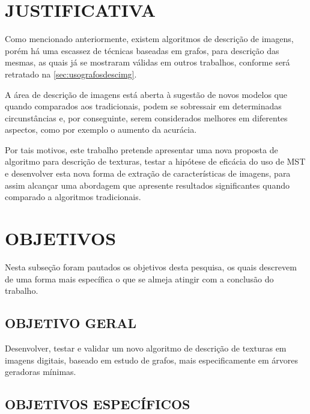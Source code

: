 \section{JUSTIFICATIVA}
\label{sec:justificativa}

\par Como mencionado anteriormente, existem algoritmos de descrição de imagens, porém há uma escassez de técnicas baseadas em grafos, para descrição das mesmas, as quais já se mostraram válidas em outros trabalhos, conforme será retratado na \autoref{sec:usografosdescimg}.

\par A área de descrição de imagens está aberta à sugestão de novos modelos que quando comparados aos tradicionais, podem se sobressair em determinadas circunstâncias e, por conseguinte, serem considerados melhores em diferentes aspectos, como por exemplo o aumento da acurácia. 

\par Por tais motivos, este trabalho pretende apresentar uma nova proposta de algoritmo para descrição de texturas, testar a hipótese de eficácia do uso de MST e desenvolver esta nova forma de extração de características de imagens, para assim alcançar uma abordagem que apresente resultados significantes quando comparado a algoritmos tradicionais.

\section{OBJETIVOS}
\label{sec:objetivos}

\par Nesta subseção foram pautados os objetivos desta pesquisa, os quais descrevem de uma forma mais específica o que se almeja atingir com a conclusão do trabalho.

\subsection{OBJETIVO GERAL}
\label{subsec:objgerais}

\par Desenvolver, testar e validar um novo algoritmo de descrição de texturas em imagens digitais, baseado em estudo de grafos, mais especificamente em árvores geradoras mínimas. 

\subsection{OBJETIVOS ESPECÍFICOS}
\label{subsec:objespecificos}

